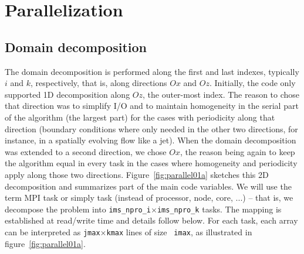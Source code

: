 \chapter{Parallelization}\label{sec:mpi}

\section{Domain decomposition}

The domain decomposition is performed along the first and last indexes,
typically $i$ and $k$, respectively, that is, along directions $Ox$ and
$Oz$. Initially, the code only supported 1D decomposition along $Oz$, the
outer-most index. The reason to chose that direction was to simplify I/O and to
maintain homogeneity in the serial part of the algorithm (the largest part) for
the cases with periodicity along that direction (boundary conditions where only
needed in the other two directions, for instance, in a spatially evolving flow
like a jet). When the domain decomposition was extended to a second direction,
we chose $Ox$, the reason being again to keep the algorithm equal in every task
in the cases where homogeneity and periodicity apply along those two
directions. Figure~\ref{fig:parallel01a} sketches this 2D decomposition and
summarizes part of the main code variables. We will use the term MPI task or
simply task (instead of processor, node, core, ...) -- that is, we decompose the
problem into {\tt ims\_npro\_i}$\times${\tt ims\_npro\_k} tasks.  The mapping is
established at read/write time and details follow below. For each task, each
array can be interpreted as {\tt jmax}$\times${\tt kmax} lines of size {\tt
  imax}, as illustrated in figure~\ref{fig:parallel01a}.

